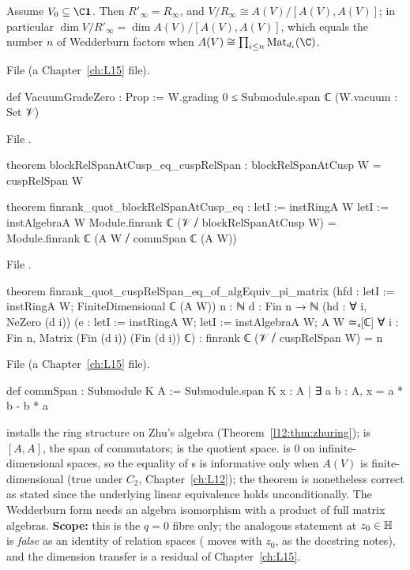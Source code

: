 \begin{theorem}\label{l14:thm:cuspfibre}
Assume $V_0\subseteq\C\mathbf 1$. Then $R'_\infty = R_\infty$, and $V/R_\infty\cong A(V)/[A(V),A(V)]$; in particular
$\dim V/R'_\infty = \dim A(V)/[A(V),A(V)]$, which equals the number $n$ of Wedderburn factors when
$A(V)\cong\prod_{i\le n}\mathrm{Mat}_{d_i}(\C)$.
\end{theorem}
\noindent File  (a Chapter~\ref{ch:L15} file).
\begin{leancode}
def VacuumGradeZero : Prop := W.grading 0 ≤ Submodule.span ℂ ({W.vacuum} : Set 𝒱)
\end{leancode}
\noindent File .
\begin{leancode}
theorem blockRelSpanAtCusp_eq_cuspRelSpan :
    blockRelSpanAtCusp W = cuspRelSpan W

theorem finrank_quot_blockRelSpanAtCusp_eq :
    letI := instRingA W
    letI := instAlgebraA W
    Module.finrank ℂ (𝒱 ⧸ blockRelSpanAtCusp W)
      = Module.finrank ℂ (A W ⧸ commSpan ℂ (A W))
\end{leancode}
\noindent File .
\begin{leancode}
theorem finrank_quot_cuspRelSpan_eq_of_algEquiv_pi_matrix
    (hfd : letI := instRingA W; FiniteDimensional ℂ (A W))
    {n : ℕ} {d : Fin n → ℕ} (hd : ∀ i, NeZero (d i))
    (e : letI := instRingA W; letI := instAlgebraA W;
      A W ≃ₐ[ℂ] ∀ i : Fin n, Matrix (Fin (d i)) (Fin (d i)) ℂ) :
    finrank ℂ (𝒱 ⧸ cuspRelSpan W) = n
\end{leancode}
\noindent File  (a Chapter~\ref{ch:L15} file).
\begin{leancode}
def commSpan : Submodule K A := Submodule.span K {x : A | ∃ a b : A, x = a * b - b * a}
\end{leancode}
\begin{dictionary}
 installs the ring structure on Zhu's algebra  (Theorem~\ref{l12:thm:zhuring});
 is $[A,A]$, the span of commutators;  is the quotient space.  is $0$ on
infinite-dimensional spaces, so the equality of s is informative only when $A(V)$ is finite-dimensional (true
under $C_2$, Chapter~\ref{ch:L12}); the theorem is nonetheless correct as stated since the underlying linear equivalence
 holds unconditionally. The Wedderburn form needs an algebra isomorphism
 with a product of full matrix algebras. \textbf{Scope:} this is the $q=0$ fibre only; the analogous statement at
$z_0\in\mathbb{H}$ is \emph{false} as an identity of relation spaces ( moves with $z_0$, as the
docstring notes), and the dimension transfer is a residual of Chapter~\ref{ch:L15}.
\end{dictionary}
